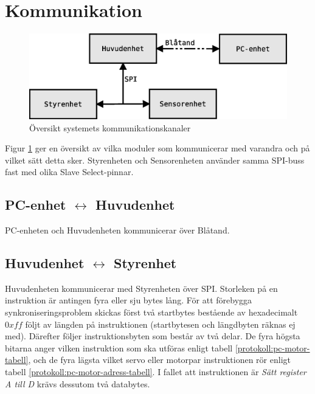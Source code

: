 \section{Kommunikation}


\begin{figure}[h!]
	\centering
	\includegraphics[scale=0.4]{grafik/kommunikation-oversikt}
	\caption{Översikt systemets kommunikationskanaler} \label{kommunikation-oversikt}
\end{figure}

Figur \ref{kommunikation-oversikt} ger en översikt av vilka moduler som kommunicerar med varandra och på vilket sätt detta sker. Styrenheten och Sensorenheten använder samma SPI-buss fast med olika Slave Select-pinnar.

\subsection{PC-enhet $\longleftrightarrow$ Huvudenhet}

PC-enheten och Huvudenheten kommunicerar över Blåtand.

\subsection{Huvudenhet $\longleftrightarrow$ Styrenhet}

Huvudenheten kommunicerar med Styrenheten över SPI. Storleken på en instruktion är antingen fyra eller sju bytes lång. För att förebygga synkroniseringsproblem skickas först två startbytes bestående av hexadecimalt $0xff$ följt av längden på instruktionen (startbytesen och längdbyten räknas ej med). Därefter följer instruktionsbyten som består av två delar. De fyra högsta bitarna anger vilken instruktion som ska utföras enligt tabell \ref{protokoll:pc-motor-tabell}, och de fyra lägsta vilket servo eller motorpar instruktionen rör enligt tabell \ref{protokoll:pc-motor-adress-tabell}. I fallet att instruktionen är \textit{Sätt register A till D} krävs dessutom två databytes.

